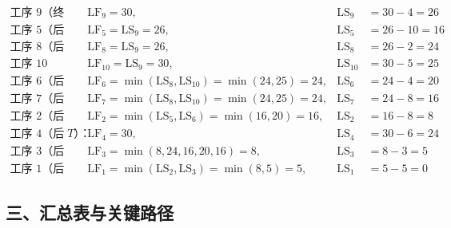 \documentclass[utf8]{ctexart}
\theoremstyle{mystyle}
\begin{document}
\begin{align*}
\text{工序~9（终止）：}      &\quad \mathrm{LF}_9=30,                                                                     &\mathrm{LS}_9   &=30-4 =26 \\
\text{工序~5（后继：9）：}   &\quad \mathrm{LF}_5=\mathrm{LS}_9=26,                                                       &\mathrm{LS}_5   &=26-10=16 \\
\text{工序~8（后继：9）：}   &\quad \mathrm{LF}_8=\mathrm{LS}_9=26,                                                       &\mathrm{LS}_8   &=26-2 =24 \\
\text{工序~10（后继：9）：}  &\quad \mathrm{LF}_{10}=\mathrm{LS}_9=30,                                                    &\mathrm{LS}_{10}&=30-5 =25 \\
\text{工序~6（后继：8,10）：}&\quad \mathrm{LF}_6=\min(\mathrm{LS}_8,\mathrm{LS}_{10})=\min(24,25)=24,                    &\mathrm{LS}_6   &=24-4 =20 \\
\text{工序~7（后继：8,10）：}&\quad \mathrm{LF}_7=\min(\mathrm{LS}_8,\mathrm{LS}_{10})=\min(24,25)=24,                    &\mathrm{LS}_7   &=24-8 =16 \\
\text{工序~2（后继：5,6）：} &\quad \mathrm{LF}_2=\min(\mathrm{LS}_5,\mathrm{LS}_6)=\min(16,20)=16,                       &\mathrm{LS}_2   &=16-8 =8  \\
\text{工序~4（后继：无，取 $T$）：}&\quad \mathrm{LF}_4=30,                                                               &\mathrm{LS}_4   &=30-6 =24 \\
\text{工序~3（后继：2,4,5,6,7）：}&\quad \mathrm{LF}_3=\min(8,24,16,20,16)=8,                                             &\mathrm{LS}_3   &=8-3  =5  \\
\text{工序~1（后继：2,3）：} &\quad \mathrm{LF}_1=\min(\mathrm{LS}_2,\mathrm{LS}_3)=\min(8,5)=5,                          &\mathrm{LS}_1   &=5-5  =0
\end{align*}
 
\subsection*{三、汇总表与关键路径}
 
\end{document}
